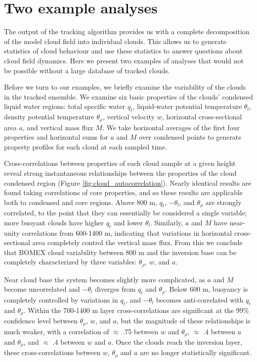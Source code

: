 \documentclass[acp]{copernicus}
\begin{document}

\section{Two example analyses}

The output of the tracking algorithm provides us with a complete decomposition 
of the model cloud field into individual clouds.  This allows us to generate 
statistics of cloud behaviour and use these statistics to answer questions 
about cloud field dynamics.  Here we present two examples of analyses that 
would not be possible without a large database of tracked clouds.

Before we turn to our examples, we briefly examine the variability of the 
clouds in the tracked ensemble.  We examine six basic properties of the 
clouds' condensed liquid water regions: total specific water $q_t$, 
liquid-water potential temperature $\theta_l$, density potential temperature 
$\theta_\rho$, vertical velocity $w$, horizontal cross-sectional area $a$, 
and vertical mass flux $M$.  We take horizontal averages of the first four 
properties and horizontal sums for $a$ and $M$ over condensed points to 
generate property profiles for each cloud at each sampled time.

Cross-correlations between properties of each cloud sample at a given height 
reveal strong instantaneous relationships between the properties of the cloud 
condensed region (Figure \ref{fig:cloud_autocorrelation}).  Nearly identical 
results are found taking correlations of core properties, and so these results 
are applicable both to condensed and core regions.  Above 800 m, $q_t$, 
$-\theta_l$, and $\theta_\rho$ are strongly correlated, to the point that 
they can essentially be considered a single variable; more buoyant clouds have 
higher $q_t$ and lower $\theta_l$.  Similarly, $a$ and $M$ have near-unity 
correlations from 600-1400 m, indicating that variations in horizontal 
cross-sectional area completely control the vertical mass flux.  From this we 
conclude that BOMEX cloud variability between 800 m and the inversion base can 
be completely characterized by three variables: $\theta_\rho$, $w$, and $a$.  

Near cloud base the system becomes slightly more complicated, as $a$ and $M$ 
become uncorrelated and $-\theta_l$ diverges from $q_t$ and $\theta_\rho$.  
Below 600 m, buoyancy is completely controlled by variations in $q_t$, and 
$-\theta_l$ becomes anti-correlated with $q_t$ and $\theta_\rho$.  Within 
the 700-1400 m layer cross-correlations are significant at the 99\% confidence 
level between $\theta_\rho$, $w$, and $a$, but the magnitude of these 
relationships is much weaker, with a correlation of $\approx$ .75 between $w$ 
and $\theta_\rho$, $\approx$ .4 between $a$ and $\theta_\rho$, and 
$\approx$ .4 between $w$ and $a$.  Once the clouds reach the inversion layer, 
these cross-correlations between $w$, $\theta_\rho$ and $a$ are no longer 
statistically significant.
\end{document}
